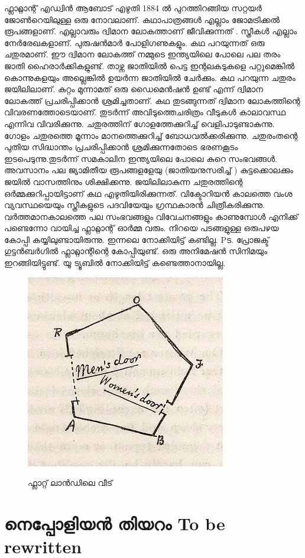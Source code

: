 \documentclass[10pt,a4paper]{report}
\begin{document}
 ഫ്ലാറ്റ്ലാന്റ് എഡ്വിൻ ആബോട് എഴുതി 1884 ൽ പുറത്തിറങ്ങിയ സറ്റയർ ജോൺറെയിലുള്ള ഒരു നോവലാണ്. കഥാപാത്രങ്ങൾ എല്ലാം ജോമട്രിക്കൽ രൂപങ്ങളാണ്. എല്ലാവരും ദ്വിമാന ലോകത്താണ് ജീവിക്കുന്നത് . സ്ത്രീകൾ എല്ലാം നേർരേഖകളാണ്. പുരുഷൻമാർ പോളിഗണുകളും. കഥ പറയുന്നത് ഒരു ചതുരമാണ്. ഈ ദ്വിമാന ലോകത്ത് നമ്മുടെ ഇന്ത്യയിലെ പോലെ പല തരം ജാതി ഹൈരാർക്കികളുണ്ട്. താഴ്ന്ന ജാതിയിൽ പെട്ട ഇന്റലകടുകളെ പറ്റുമെങ്കിൽ കൊന്നുകളയും അല്ലെങ്കിൽ ഉയർന്ന ജാതിയിൽ ചേർക്കും. കഥ പറയുന്ന ചതുരം ജയിലിലാണ്. കുറ്റം മുന്നാമത് ഒരു ഡൈമെൻഷൻ ഉണ്ട് എന്ന് ദ്വിമാന ലോകത്ത് പ്രചരിപ്പിക്കാൻ ശ്രമിച്ചതാണ്. കഥ തുടങ്ങുന്നത് ദ്വിമാന ലോകത്തിന്റെ വിവരണത്തോടെയാണ്. തുടർന്ന് അവിടുത്തെചരിത്രം വീടുകൾ കാലാവസ്ഥ എന്നിവ വിവരിക്കുന്നു. ചതുരത്തിന് ഗോളത്തേക്കുറിച്ച് വെളിപാടുണ്ടാകുന്നു. ഗോളം ചതുരത്തെ മൂന്നാം മാനത്തെക്കുറിച്ച് ബോധവൽക്കരിക്കുന്നു. ചതുരംതന്റെ പുതിയ സിദ്ധാന്തം പ്രചരിപ്പിക്കാൻ ശ്രമിക്കുന്നതോടെ ഭരണകൂടം ഇടപെടുന്നു.തുടർന്ന് സമകാലിന ഇന്ത്യയിലെ പോലെ കുറെ സംഭവങ്ങൾ. അവസാനം പല ജ്യാമിതീയ രൂപങ്ങളളേയു (ജാതിയനുസരിച്ച് ) കുട്ടക്കൊലക്കും ജയിൽ വാസത്തിനും ശിക്ഷിക്കന്നു. ജയിലിലാകുന്ന ചതുരത്തിന്റെ ഒർമ്മക്കുറിപ്പായിട്ടാണ് കഥ എഴുതിയിരിക്കുന്നത്. വിക്ടോറിയൻ കാലത്തെ വംശ വ്യവസ്ഥയെയും സ്ത്രീകളുടെ പദവിയേയും ഗ്രന്ഥകാരൻ ചിത്രീകരിക്കുന്നു. വർത്തമാനകാലത്തെ പല സംഭവങ്ങളും വിവേചനങ്ങളും കാണുമ്പോൾ എനിക്ക് പണ്ടെന്നോ വായിച്ച ഫ്ലാറ്റ്ലാന്റ് ഓർമ്മ വരും. നിറയെ പടങ്ങളുള്ള ഒരുപഴയ കോപ്പി കയ്യിലുണ്ടായിരുന്നു. ഇന്നലെ നോക്കിയിട്ട് കണ്ടില്ല. Pട. പ്രോജക്ട് ഗുട്ടൻബർഗിൽ ഫ്ലാറ്റ്ലാന്റിന്റെ കോപ്പിയുണ്ട്. ഒരു അനിമേഷൻ സിനിമയും ഇറങ്ങിയിട്ടുണ്ട്. യൂ ട്യൂബിൽ നോക്കിയിട്ട് കണ്ടെത്താനായില്ല.
  \begin{figure}[H]
  \center
\includegraphics[scale=.7]{images/flat1}
\label{flat2}
\caption{  ഫ്ലാറ്റ്  ലാൻഡിലെ വീട്  }
\end{figure}

\section{നെപ്പോളിയൻ തിയറം To be rewritten}
\end{document}
